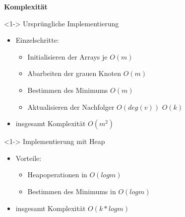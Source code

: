 \begin{frame}
	\begin{center}
		\LARGE {\textbf{Komplexität}}
	\end{center}
\end{frame}

\begin{frame}
	\begin{block} <1-> {Ursprüngliche Implementierung}
		\begin{itemize}
			\item <2--> Einzelschritte:
			\begin{itemize}
				\item <3-> Initialisieren der Arrays je $O(m)$
				\item <4-> Abarbeiten der grauen Knoten $O(m)$
				\item <5-> Bestimmen des Minimums $O(m)$
				\item <6-> Aktualisieren der Nachfolger $O(deg(v))$ \rightarrow $O(k)$
			\end{itemize}
			\item <7-> insgesamt Komplexität $O(m^{2})$
		\end{itemize}
	\end{block}	
\end{frame}

\begin{frame}
	\begin{block} <1-> {Implementierung mit Heap}
		\begin{itemize}
			\item <1-> Vorteile:
			\begin{itemize}
				\item <2-> Heapoperationen in $O(log m)$
				\item <3-> Bestimmen des Minimums in $O(log m)$
			\end{itemize}
			\item <4-> insgesamt Komplexität $O(k*log m)$
		\end{itemize}
	\end{block}		
\end{frame}